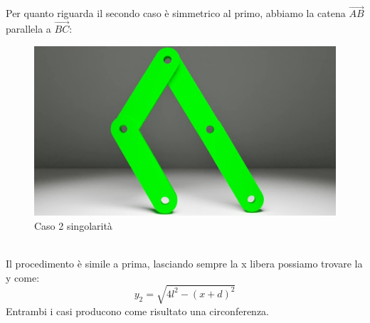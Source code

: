 Per quanto riguarda il secondo caso è simmetrico al primo, abbiamo la catena $\overrightarrow{AB}$ parallela a $\overrightarrow{BC}$:
\begin{figure}[ht]
	\begin{center}
		\includegraphics[scale=0.4]{Immagini/Singolarity/2}
		\caption{Caso 2 singolarità}
	\end{center}
\end{figure}
\\Il procedimento è simile a prima, lasciando sempre la x libera possiamo trovare la y come:
\begin{equation}
    y_2 = \sqrt{4l^2-(x+d)^2}
\end{equation}
Entrambi i casi producono come risultato una circonferenza.
